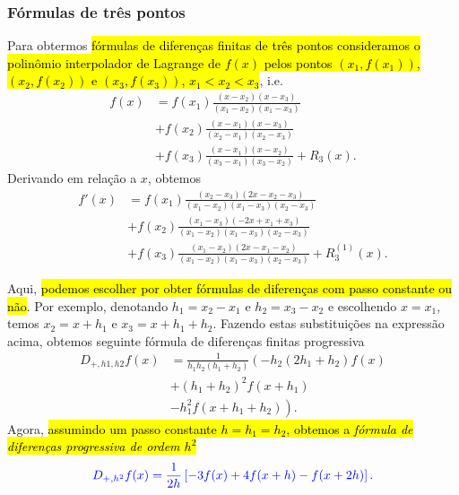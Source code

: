 \subsubsection{Fórmulas de três pontos}

Para obtermos \hl{fórmulas de diferenças finitas de três pontos consideramos o polinômio interpolador de Lagrange de $f(x)$ pelos pontos $(x_1, f(x_1))$, $(x_2, f(x_2))$ e $(x_3, f(x_3))$, $x_1<x_2<x_3$}, i.e.
\begin{align}
  f(x) &= f(x_1)\frac{(x-x_2)(x-x_3)}{(x_1-x_2)(x_1-x_3)} \\
  &+ f(x_2)\frac{(x-x_1)(x-x_3)}{(x_2-x_1)(x_2-x_3)} \\
  &+ f(x_3)\frac{(x-x_1)(x-x_2)}{(x_3-x_1)(x_3-x_2)} + R_3(x).
\end{align}
Derivando em relação a $x$, obtemos
\begin{align}\label{eq:aux_deriv1}
  f'(x) &= f{\left (x_{1} \right )}\frac{\left(x_{2} - x_{3}\right) \left(2 x- x_{2} - x_{3}\right)}{\left(x_{1} - x_{2}\right) \left(x_{1} - x_{3}\right) \left(x_{2} - x_{3}\right)} \\
  &+ f{\left (x_{2} \right )}\frac{\left(x_{1} - x_{3}\right) \left(- 2 x + x_{1} + x_{3}\right)}{\left(x_{1} - x_{2}\right) \left(x_{1} - x_{3}\right) \left(x_{2} - x_{3}\right)}\\
  &+ f\left(x_{3} \right)\frac{\left(x_{1} - x_{2}\right)\left(2 x - x_{1} - x_{2}\right)}{\left(x_{1} - x_{2}\right) \left(x_{1} - x_{3}\right) \left(x_{2} - x_{3}\right)} + R_3^{(1)}(x).
\end{align}

Aqui, \hl{podemos escolher por obter fórmulas de diferenças com passo constante ou não}. Por exemplo, denotando $h_1=x_2-x_1$ e $h_2=x_3-x_2$ e escolhendo $x=x_1$, temos $x_2 = x+h_1$ e $x_3 = x+h_1+h_2$. Fazendo estas substituições na expressão acima, obtemos seguinte fórmula de diferenças finitas progressiva
\begin{align}
  D_{+,h1,h2}f(x) &= \frac{1}{h_{1} h_{2} \left(h_{1} + h_{2}\right)} \left(- h_{2} \left(2 h_{1} + h_{2}\right) f{\left (x \right )} \right.\\
    &+ \left. \left(h_{1} + h_{2}\right)^{2} f{\left (x + h_{1} \right )} \right.\\
    &- \left. h_{1}^{2} f{\left (x + h_{1} + h_{2} \right )} \right).
\end{align}
Agora, \hl{assumindo um passo constante $h=h_1=h_2$, obtemos a \emph{fórmula de diferenças progressiva de ordem $h^2$}}
\begin{equation}\color{blue}D_{+,h^2}f(x) = \frac{1}{2 h} \left[- 3 f{\left (x \right )} + 4 f{\left (x + h \right )} - f{\left (x + 2 h \right )}\right].\label{eq:dfp_3pts}
\end{equation}

